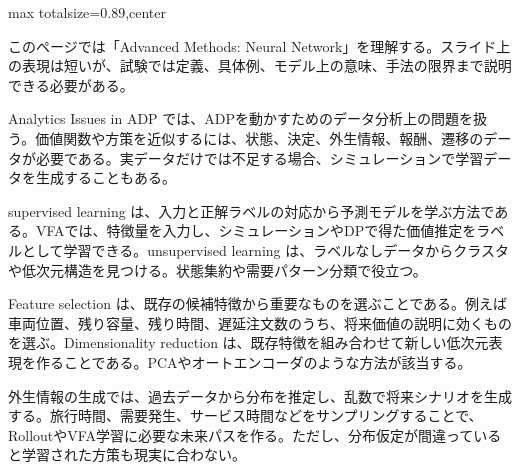 \begin{minipage}[t]{0.58\textwidth}
\begin{adjustbox}{max totalsize={\textwidth}{0.89\textheight},center}
\begin{minipage}{\textwidth}\scriptsize
{}このページでは「Advanced Methods: Neural Network」を理解する。スライド上の表現は短いが、試験では定義、具体例、モデル上の意味、手法の限界まで説明できる必要がある。\par
Analytics Issues in ADP では、ADPを動かすためのデータ分析上の問題を扱う。価値関数や方策を近似するには、状態、決定、外生情報、報酬、遷移のデータが必要である。実データだけでは不足する場合、シミュレーションで学習データを生成することもある。\par
supervised learning は、入力と正解ラベルの対応から予測モデルを学ぶ方法である。VFAでは、特徴量を入力し、シミュレーションやDPで得た価値推定をラベルとして学習できる。unsupervised learning は、ラベルなしデータからクラスタや低次元構造を見つける。状態集約や需要パターン分類で役立つ。\par
Feature selection は、既存の候補特徴から重要なものを選ぶことである。例えば車両位置、残り容量、残り時間、遅延注文数のうち、将来価値の説明に効くものを選ぶ。Dimensionality reduction は、既存特徴を組み合わせて新しい低次元表現を作ることである。PCAやオートエンコーダのような方法が該当する。\par
外生情報の生成では、過去データから分布を推定し、乱数で将来シナリオを生成する。旅行時間、需要発生、サービス時間などをサンプリングすることで、RolloutやVFA学習に必要な未来パスを作る。ただし、分布仮定が間違っていると学習された方策も現実に合わない。\par

\end{minipage}
\end{adjustbox}
\end{minipage}
